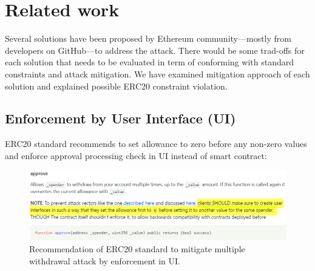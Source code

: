 
\newpage
\section{Related work}
Several solutions have been proposed by Ethereum community---mostly from developers on GitHub\cite{Ref07}---to address the attack. There would be some trad-offs for each solution that needs to be evaluated in term of conforming with standard constraints and attack mitigation. We have examined mitigation approach of each solution and explained possible ERC20 constraint violation.

\subsection{Enforcement by User Interface (UI)}
ERC20 standard recommends to set allowance to zero before any non-zero values and enforce approval processing check in UI instead of smart contract:
\begin{figure}[t!]
	\centering
	\includegraphics[width=1.0\linewidth]{figures/multiple_withdrawal_03.png}
	\caption{Recommendation of ERC20 standard to mitigate multiple withdrawal attack by enforcement in UI.}
\end{figure}


